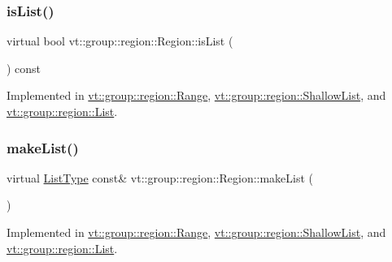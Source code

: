 \mbox{\label{structvt_1_1group_1_1region_1_1_region_a5c05e6ebee5a6d7e77d9ebf33c9ff50c}} 
\subsubsection{\texorpdfstring{is\+List()}{isList()}}
{\footnotesize\ttfamily virtual bool vt\+::group\+::region\+::\+Region\+::is\+List (\begin{DoxyParamCaption}{ }\end{DoxyParamCaption}) const\hspace{0.3cm}{\ttfamily [pure virtual]}}



Implemented in \hyperlink{structvt_1_1group_1_1region_1_1_range_aaa2df0017d61507802bcc90a88fcda91}{vt\+::group\+::region\+::\+Range}, \hyperlink{structvt_1_1group_1_1region_1_1_shallow_list_a5d83012cacf2a8ebeb3edb55603fceaa}{vt\+::group\+::region\+::\+Shallow\+List}, and \hyperlink{structvt_1_1group_1_1region_1_1_list_abdde7f8c33453db1938e9a27b3f18bd9}{vt\+::group\+::region\+::\+List}.

\mbox{\label{structvt_1_1group_1_1region_1_1_region_ac85c027b3c402c712c888aefc198c6be}} 
\subsubsection{\texorpdfstring{make\+List()}{makeList()}}
{\footnotesize\ttfamily virtual \hyperlink{structvt_1_1group_1_1region_1_1_region_a4e35b2fc6dca06aca0b7bc0e19b35c5a}{List\+Type} const\& vt\+::group\+::region\+::\+Region\+::make\+List (\begin{DoxyParamCaption}{ }\end{DoxyParamCaption})\hspace{0.3cm}{\ttfamily [pure virtual]}}



Implemented in \hyperlink{structvt_1_1group_1_1region_1_1_range_abd64b2d424a89ab0f603be15957d0fd4}{vt\+::group\+::region\+::\+Range}, \hyperlink{structvt_1_1group_1_1region_1_1_shallow_list_aecf1849757306e2d8a3c339a4bdb6453}{vt\+::group\+::region\+::\+Shallow\+List}, and \hyperlink{structvt_1_1group_1_1region_1_1_list_ade171ca43a1bef2feef9952625fba71a}{vt\+::group\+::region\+::\+List}.

